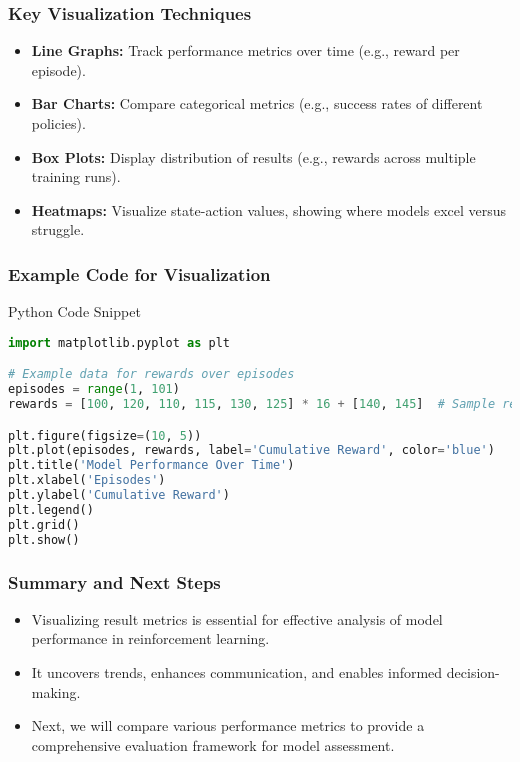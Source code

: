 \documentclass{beamer}
\begin{document}
\begin{frame}[fragile]
    \frametitle{Key Visualization Techniques}
    \begin{itemize}
        \item \textbf{Line Graphs:} Track performance metrics over time (e.g., reward per episode).
        \item \textbf{Bar Charts:} Compare categorical metrics (e.g., success rates of different policies).
        \item \textbf{Box Plots:} Display distribution of results (e.g., rewards across multiple training runs).
        \item \textbf{Heatmaps:} Visualize state-action values, showing where models excel versus struggle.
    \end{itemize}
\end{frame}

\begin{frame}[fragile]
    \frametitle{Example Code for Visualization}
    \begin{block}{Python Code Snippet}
        \begin{lstlisting}[language=Python]
import matplotlib.pyplot as plt

# Example data for rewards over episodes
episodes = range(1, 101)
rewards = [100, 120, 110, 115, 130, 125] * 16 + [140, 145]  # Sample rewards

plt.figure(figsize=(10, 5))
plt.plot(episodes, rewards, label='Cumulative Reward', color='blue')
plt.title('Model Performance Over Time')
plt.xlabel('Episodes')
plt.ylabel('Cumulative Reward')
plt.legend()
plt.grid()
plt.show()
        \end{lstlisting}
    \end{block}
\end{frame}

\begin{frame}[fragile]
    \frametitle{Summary and Next Steps}
    \begin{itemize}
        \item Visualizing result metrics is essential for effective analysis of model performance in reinforcement learning.
        \item It uncovers trends, enhances communication, and enables informed decision-making.
        \item Next, we will compare various performance metrics to provide a comprehensive evaluation framework for model assessment.
    \end{itemize}
\end{frame}
\end{document}

